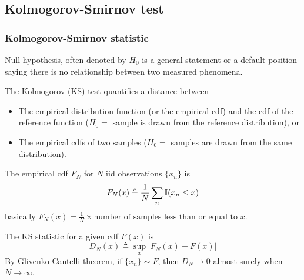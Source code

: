 \subsection{Kolmogorov-Smirnov test}
\subsubsection{Kolmogorov-Smirnov statistic}
Null hypothesis, often denoted by $H_0$ is a general statement or a default position saying there is no relationship between two measured phenomena. 

The Kolmogorov (KS) test quantifies a distance between
\begin{itemize}
	\item The empirical distribution function (or the empirical cdf) and the cdf of the reference function ($H_0 = $ sample is drawn from the reference distribution), or
	\item The empirical cdfs of two samples ($H_0 = $ samples are drawn from the same distribution).
\end{itemize}

The empirical cdf $F_N$ for $N$ iid observations $\{x_n\}$ is
\begin{equation}
	F_N(x) \triangleq \frac{1}{N} \sum_n \operatorname{\mathbb I}(x_n \leq x)
\end{equation}
basically $F_N(x) = \frac{1}{N} \times \text{number of samples less than or equal to } x$.

The KS statistic for a given cdf $F(x)$ is
\begin{equation}
	D_N(x) \triangleq \sup_x \left|F_N(x) - F(x)\right|
\end{equation}
By Glivenko-Cantelli theorem, if $\{x_n\} \sim F$, then $D_N \to 0$ almost surely when $N \to \infty$.